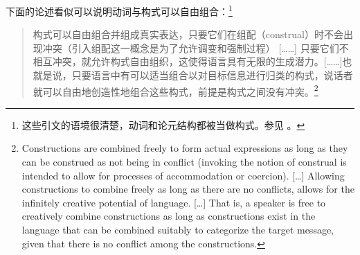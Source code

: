     下面的论述看似可以说明动词与构式可以自由组合：\footnote{这些引文的语境很清楚，动词和论元结构都被当做构式。参见 \citet[，例（2）]{Goldberg2006a}。} 


\begin{quotation}
构式可以自由组合并组成真实表达，只要它们在组配（construal）时不会出现冲突（引入组配这一概念是为了允许调变和强制过程）
[……]
只要它们不相互冲突，就允许构式自由组织，这使得语言具有无限的生成潜力。[……]也就是说，只要语言中有可以适当组合以对目标信息进行归类的构式，说话者就可以自由地创造性地组合这些构式，前提是构式之间没有冲突。\citep[]{Goldberg2006a}\footnote{%
Constructions are combined freely to form actual expressions as long
as they can be construed as not being in conflict (invoking the notion
of construal is intended to allow for processes of accommodation or
coercion). 
[\ldots] 
Allowing constructions to combine freely as long as there are no
conflicts, allows for the infinitely creative potential of language.
[\ldots] That is, a speaker is free to creatively combine constructions as
long as constructions exist in the language that can be combined
suitably to categorize the target message, given that there is no
conflict among the constructions.
} 
\end{quotation}

